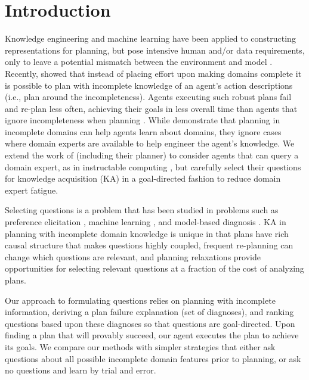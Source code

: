 \documentclass{article}
\begin{document}
\section{Introduction}

Knowledge engineering \citep{ickeps09} and machine learning
\citep{arms,DBLP:conf/aaai/OatesC96} have been applied to constructing
representations for planning, but pose intensive human and/or data requirements,
only to leave a potential mismatch between the environment and model
\citep{modellite}.  Recently, \citet{bryce-icaps11} showed that instead of
placing effort upon making domains complete it is possible to plan with
incomplete knowledge of an agent's action descriptions (i.e., plan around the
incompleteness).  Agents executing such robust plans fail and re-plan less often,
achieving their goals in less overall time than agents that ignore
incompleteness when planning \citep{DBLP:conf/aips/ChangA06}.  While
\citet{bryce-icaps11} demonstrate that planning in incomplete domains can
help agents learn about domains, they ignore cases where domain experts are
available to help engineer the agent's knowledge.  We extend the work of
\citet{bryce-icaps11} (including their  planner) to consider agents
that can query a domain expert, as in instructable computing \citep{mable}, but carefully select their questions for
knowledge acquisition (KA) in a goal-directed fashion to reduce domain expert
fatigue.

Selecting questions is a problem that has been studied in problems such as
preference elicitation \citep{DBLP:conf/aaai/Boutilier02}, machine learning
\citep{AICPub1812:2011}, and model-based diagnosis
\citep{deKleer:1992:CDS:140524.140531}.  KA in planning with
incomplete domain knowledge is unique in that plans have rich causal structure
that makes questions highly coupled, frequent re-planning can change which
questions are relevant, and planning relaxations provide opportunities for
selecting relevant questions at a fraction of the cost of analyzing  plans.  

Our approach to formulating questions relies on planning with incomplete
information, deriving a plan failure explanation (set of diagnoses), and ranking
questions based upon these diagnoses so that questions are goal-directed.  Upon
finding a plan that will provably succeed, our agent executes the plan to
achieve its goals.  We compare our methods with simpler strategies that either
ask questions about all possible incomplete domain features prior to planning, or ask no questions and
learn by trial and error.
\end{document}
